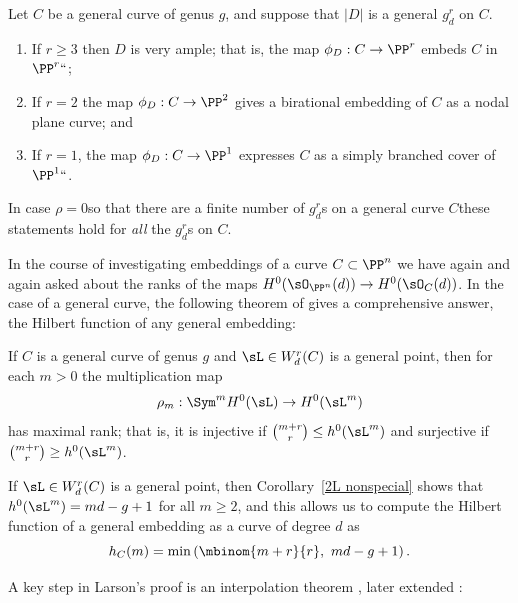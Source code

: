 \begin{npt}
\begin{theorem}
\label{grd omnibus}
Let $C$ be a general curve of genus $g$, and suppose that
$|D|$ is a general $g^r_d$ on $C$.

 \begin{enumerate}
\item If $r \geq 3$ then $D$ is very ample; that is, the map $\phi_D :
C \to \PP^r$   embeds $C$ in $\PP^r` `$;
\item If $r=2$ the map $\phi_D : C \to \PP^2$ gives a birational embedding
of $C$ as a nodal plane curve; and
\item If $r=1$, the map $\phi_D : C \to \PP^1$ expresses $C$ as a simply
branched cover of $\PP^1` `$.
\end{enumerate}
\end{theorem}
\end{npt}

In case $\rho = 0$\emdash so that there are a finite number of $g^r_d$s
on a general curve $C$\emdash these statements hold for \emph{all}
the $g^r_d$s on $C$.

In the course of investigating embeddings of a curve $C\subset \PP^n$
we have again and again
asked about the ranks of the maps $H^0(\sO_{\PP^n}(d)) \to
H^0(\sO_C(d))$. In the case of
a general curve, the following theorem of
%
%
gives a
comprehensive answer,
 the Hilbert function of any general embedding:

\begin{theorem}\label{maximal rank}
If $C$ is a general curve of genus $g$ and $\sL  \in W^r_d(C)$ is a
%
general point, then for each $m > 0$ the multiplication map
$$
\rho_m : \Sym^m H^0(\sL ) \to H^0(\sL ^m)
$$
has maximal rank; that is, it is injective if $\tbinom{m+r}{r} \leq
h^0(\sL ^m)$ and surjective if $\tbinom{m+r}{r} \geq h^0(\sL ^m)$.
\end{theorem}


If $\sL\in W^r_d(C)$ is a general point, then Corollary~\ref{2L nonspecial}
shows that $h^0(\sL ^m) = md-g+1$ for all $m \geq 2$,
and this allows us to compute the Hilbert function of a general embedding
as a curve
of degree $d$ as
 $$
 h_C(m) = \min\left(\mbinom{m+r}{r},\ md-g+1\right).
 $$

A key step in Larson's proof is an interpolation theorem \cite{MR3908670},
later extended 
:
%
%

